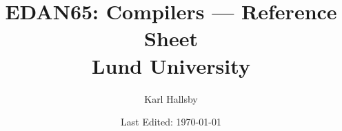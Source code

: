 

\usepackage[outputdir=./TeX_Output]{minted} %



\graphicspath{{./Drawings/EDAN65-Compilers}} %


\DeclareMathOperator{\True}{\text{True}}
\DeclareMathOperator{\False}{\text{False}}
\DeclareMathOperator{\OR}{\parallel}
\DeclareMathOperator{\AND}{\&\&}
\DeclareMathOperator{\Nullable}{\text{Nullable}}
\DeclareMathOperator{\FIRST}{\text{FIRST}}
\DeclareMathOperator{\FOLLOW}{\text{FOLLOW}}
\DeclareMathOperator{\LLParse}{\text{LL}}
\DeclareMathOperator{\LRParse}{\text{LR}}
\DeclareMathOperator{\LALRParse}{\text{LALR}}

\newcommand{\JastAdd}{\href{http://jastadd.org/web/documentation/reference-manual.php}{JastAdd}}
\newcommand{\rbpRegister}{\texttt{\%rbp}}
\newcommand{\rspRegister}{\texttt{\%rsp}}
\newcommand{\ripRegister}{\texttt{\%rip}}
\newcommand{\raxRegister}{\texttt{\%rax}}
\newcommand{\rbxRegister}{\texttt{\%rbx}}

\begin{titlepage}
  \title{EDAN65: Compilers --- Reference Sheet \\ Lund University}
  \author{Karl Hallsby}
  \date{Last Edited: \today} %
\end{titlepage}


\maketitle
{} %
\tableofcontents
\clearpage
{} %

